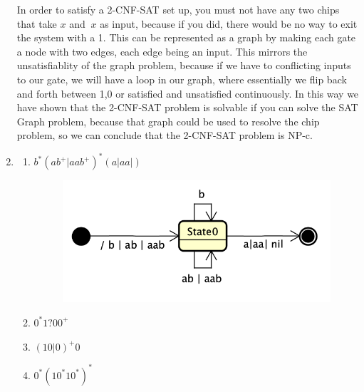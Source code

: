 \documentclass{article}
\begin{document}
\begin{enumerate}
    In order to satisfy a 2-CNF-SAT set up, you must not have any two chips that take \(x\) and \(~x\) as input, because if you did, there would be no way to exit the system with a 1. This can be represented as a graph by making each gate a node with two edges, each edge being an input. This mirrors the unsatisfiablity of the graph problem, because if we have to conflicting inputs to our gate, we will have a loop in our graph, where essentially we flip back and forth between 1,0 or satisfied and unsatisfied continuously. In this way we have shown that the 2-CNF-SAT problem is solvable if you can solve the SAT Graph problem, because that graph could be used to resolve the chip problem, so we can conclude that the 2-CNF-SAT problem is NP-c.

\item 
    \begin{enumerate}[label=(\alph*)]
        \item
            \(b^*(ab^+|aab^+)^*(a|aa|)\)
            
            \begin{figure}[H]
            \centerline{\includegraphics[width=12cm]{stateMachine.png}}
            \end{figure}

        \item
            \(0^*1?00^+\)
            
        \item
            \((10|0)^+0\)
        
        \item
            \(0^*(10^*10^*)^*\)
    \end{enumerate}
\end{enumerate}
\end{document}
